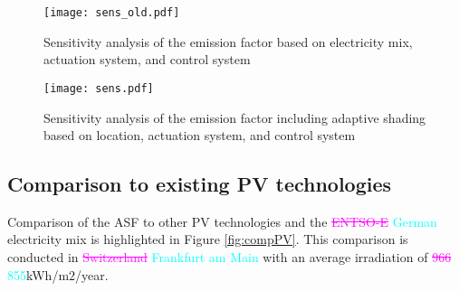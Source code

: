

\begin{figure}[H]
\begin{center}
\begin{mdframed}[linecolor=magenta, linewidth=2pt]
\texttt{[image: sens\_old.pdf]}
\caption{Sensitivity analysis of the emission factor based on electricity mix, actuation system, and control system}
\label{fig:sensold}
\end{mdframed}
\end{center}
\end{figure}

\begin{figure}[H]
\begin{center}
\begin{mdframed}[linecolor=cyan, linewidth=2pt]
\texttt{[image: sens.pdf]}
\caption{Sensitivity analysis of the emission factor including adaptive shading based on location, actuation system, and control system}
\label{fig:sens}
\end{mdframed}
\end{center}
\end{figure}

\subsection{Comparison to existing PV technologies}

Comparison of the ASF to other PV technologies and the \textcolor{magenta}{\sout{ENTSO-E}} \textcolor{cyan}{German} electricity mix is highlighted in Figure \ref{fig:compPV}. This comparison is conducted in \textcolor{magenta}{\sout{Switzerland}} \textcolor{cyan}{Frankfurt am Main} with an average irradiation of \textcolor{magenta}{\sout{966}} \textcolor{cyan}{855}kWh/m$2$/year.\

